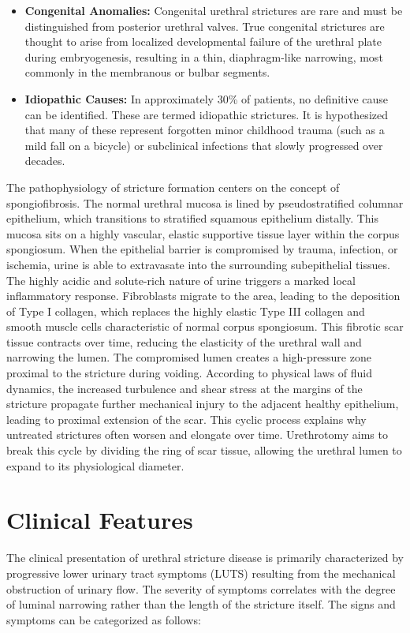 \begin{itemize}
  \item \textbf{Congenital Anomalies:} Congenital urethral strictures are rare and must be distinguished from posterior urethral valves. True congenital strictures are thought to arise from localized developmental failure of the urethral plate during embryogenesis, resulting in a thin, diaphragm-like narrowing, most commonly in the membranous or bulbar segments.
  \item \textbf{Idiopathic Causes:} In approximately 30\% of patients, no definitive cause can be identified. These are termed idiopathic strictures. It is hypothesized that many of these represent forgotten minor childhood trauma (such as a mild fall on a bicycle) or subclinical infections that slowly progressed over decades.
\end{itemize}

The pathophysiology of stricture formation centers on the concept of spongiofibrosis. The normal urethral mucosa is lined by pseudostratified columnar epithelium, which transitions to stratified squamous epithelium distally. This mucosa sits on a highly vascular, elastic supportive tissue layer within the corpus spongiosum. When the epithelial barrier is compromised by trauma, infection, or ischemia, urine is able to extravasate into the surrounding subepithelial tissues. The highly acidic and solute-rich nature of urine triggers a marked local inflammatory response. Fibroblasts migrate to the area, leading to the deposition of Type I collagen, which replaces the highly elastic Type III collagen and smooth muscle cells characteristic of normal corpus spongiosum. This fibrotic scar tissue contracts over time, reducing the elasticity of the urethral wall and narrowing the lumen. The compromised lumen creates a high-pressure zone proximal to the stricture during voiding. According to physical laws of fluid dynamics, the increased turbulence and shear stress at the margins of the stricture propagate further mechanical injury to the adjacent healthy epithelium, leading to proximal extension of the scar. This cyclic process explains why untreated strictures often worsen and elongate over time. Urethrotomy aims to break this cycle by dividing the ring of scar tissue, allowing the urethral lumen to expand to its physiological diameter.

\section*{Clinical Features}
The clinical presentation of urethral stricture disease is primarily characterized by progressive lower urinary tract symptoms (LUTS) resulting from the mechanical obstruction of urinary flow. The severity of symptoms correlates with the degree of luminal narrowing rather than the length of the stricture itself. The signs and symptoms can be categorized as follows:

